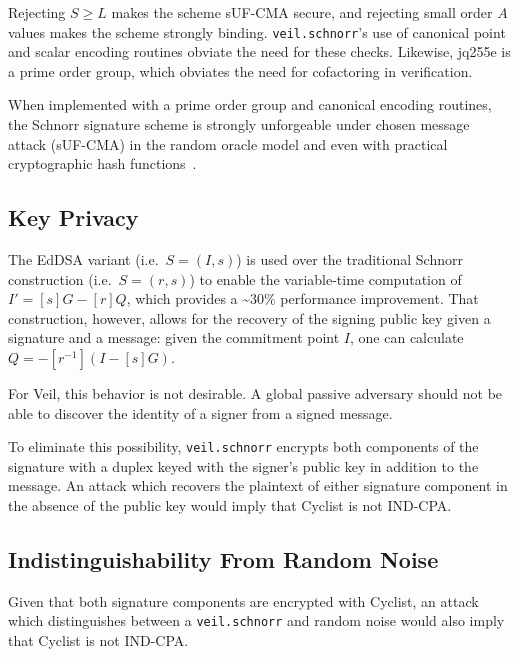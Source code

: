 Rejecting $S \geq L$ makes the scheme sUF-CMA secure, and rejecting small order $A$ values makes the
scheme strongly binding.
\texttt{veil.schnorr}'s use of canonical point and scalar encoding routines obviate the need for
these checks.
Likewise, jq255e is a prime order group, which obviates the need for cofactoring in verification.

When implemented with a prime order group and canonical encoding routines, the Schnorr signature
scheme is strongly unforgeable under chosen message attack (sUF-CMA) in the random oracle model and
even with practical cryptographic hash functions~\cite{pointcheval2000,neven2009}.

\subsection{Key Privacy}\label{subsec:veil.schnorr-key-privacy}

The EdDSA variant (i.e.\ $S=(I,s)$) is used over the traditional Schnorr construction (i.e.\
$S=(r,s)$) to enable the variable-time computation of $I'=[s]G - [r]Q$, which provides a
\textasciitilde30\% performance improvement.
That construction, however, allows for the recovery of the signing public key given a signature and
a message: given the commitment point $I$, one can calculate $Q=-[r^{-1}](I - [s]G)$.

For Veil, this behavior is not desirable.
A global passive adversary should not be able to discover the identity of a signer from a signed
message.

To eliminate this possibility, \texttt{veil.schnorr} encrypts both components of the signature with
a duplex keyed with the signer's public key in addition to the message.
An attack which recovers the plaintext of either signature component in the absence of the public
key would imply that Cyclist is not IND-CPA\@.

\subsection{Indistinguishability From Random Noise}\label{subsec:veil.schnorr-indistinguishability}

Given that both signature components are encrypted with Cyclist, an attack which distinguishes
between a \texttt{veil.schnorr} and random noise would also imply that Cyclist is not IND-CPA\@.
